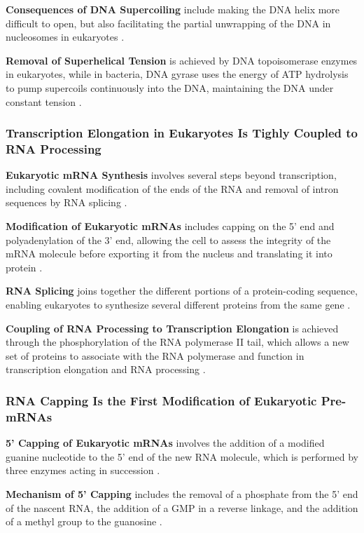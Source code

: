 \textbf{Consequences of DNA Supercoiling} include making the DNA helix more difficult to open, but also facilitating the partial unwrapping of the DNA in nucleosomes in eukaryotes \cite*{L1-Chapter6}.

\textbf{Removal of Superhelical Tension} is achieved by DNA topoisomerase enzymes in eukaryotes, while in bacteria, DNA gyrase uses the energy of ATP hydrolysis to pump supercoils continuously into the DNA, maintaining the DNA under constant tension \cite*{L1-Chapter6}.

\subsubsection*{Transcription Elongation in Eukaryotes Is Tighly Coupled to RNA Processing}
\textbf{Eukaryotic mRNA Synthesis} involves several steps beyond transcription, including covalent modification of the ends of the RNA and removal of intron sequences by RNA splicing \cite*{L1-Chapter6}.

\textbf{Modification of Eukaryotic mRNAs} includes capping on the 5' end and polyadenylation of the 3' end, allowing the cell to assess the integrity of the mRNA molecule before exporting it from the nucleus and translating it into protein \cite*{L1-Chapter6}.

\textbf{RNA Splicing} joins together the different portions of a protein-coding sequence, enabling eukaryotes to synthesize several different proteins from the same gene \cite*{L1-Chapter6}. 

\textbf{Coupling of RNA Processing to Transcription Elongation} is achieved through the phosphorylation of the RNA polymerase II tail, which allows a new set of proteins to associate with the RNA polymerase and function in transcription elongation and RNA processing \cite*{L1-Chapter6}.

\subsubsection*{RNA Capping Is the First Modification of Eukaryotic Pre-mRNAs}
\textbf{5' Capping of Eukaryotic mRNAs} involves the addition of a modified guanine nucleotide to the 5' end of the new RNA molecule, which is performed by three enzymes acting in succession \cite*{L1-Chapter6}.

\textbf{Mechanism of 5' Capping} includes the removal of a phosphate from the 5' end of the nascent RNA, the addition of a GMP in a reverse linkage, and the addition of a methyl group to the guanosine \cite*{L1-Chapter6}.

